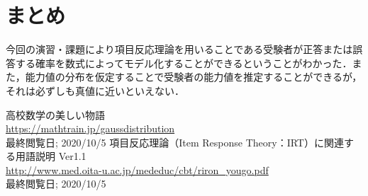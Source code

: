 \documentclass[12pt]{jarticle}
\begin{document}
\section{まとめ}
今回の演習・課題により項目反応理論を用いることである受験者が正答または誤答する確率を数式によってモデル化することができるということがわかった．また，能力値の分布を仮定することで受験者の能力値を推定することができるが，それは必ずしも真値に近いといえない．


\begin{thebibliography}{99}
    \label{sannkoubunnkenn_chapter}
    \bibitem{} 高校数学の美しい物語\\
    \url{https://mathtrain.jp/gaussdistribution}\\
    最終閲覧日; 2020/10/5
    \bibitem{} 項目反応理論（Item Response Theory：IRT）に関連する用語説明 Ver1.1\\
    \url{http://www.med.oita-u.ac.jp/mededuc/cbt/riron_yougo.pdf}\\
    最終閲覧日; 2020/10/5
\end{thebibliography}

\end{document}

